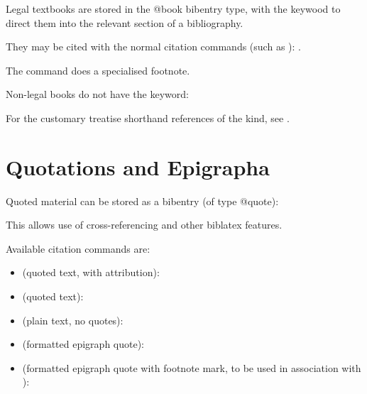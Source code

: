 \p Legal textbooks are stored in the @book bibentry type, with the keywood  to direct them into the relevant section of a bibliography.

\p They may be cited with the normal citation commands (such as ): \cite{lrcns}.

\p The  command does a specialised footnote.

\p Non-legal books do not have the keyword: \cite{litlaw}

\p For the customary treatise shorthand references of the  kind, see .%


\section{Quotations and Epigrapha}
\label{sec:epigrapha}

\bigskip
\p Quoted material can be stored as a bibentry (of type @quote):

This allows use of cross-referencing and other biblatex features.

\p Available citation commands are:

\begin{itemize}\item {} (quoted text, with attribution):\end{itemize} \begin{quotation}\end{quotation}
\begin{itemize}\item{} (quoted text):\end{itemize} \begin{quotation}\end{quotation}
\begin{itemize}\item{} (plain text, no quotes): \end{itemize}\begin{quotation}\end{quotation}
\begin{itemize}\item{} (formatted epigraph quote): \end{itemize}\begin{quotation}\end{quotation}
\begin{itemize}\item{} (formatted epigraph quote with footnote mark, to be used in association with ):\end{itemize} \begin{quotation}\end{quotation}

